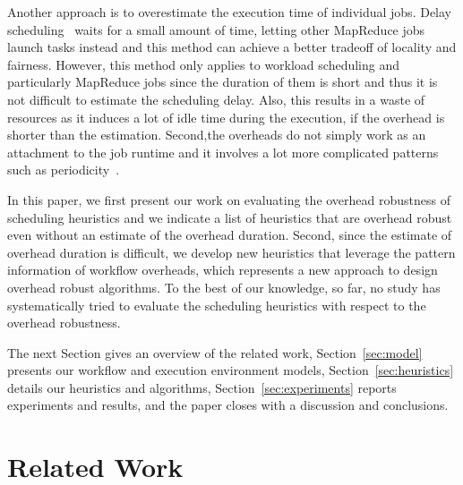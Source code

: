 \documentclass[final]{IEEEtran}
\begin{document}
Another approach is to overestimate the execution time of individual jobs. Delay scheduling~\cite{Zaharia10} waits for a small amount of time, letting other MapReduce jobs launch tasks instead and this method can achieve a better tradeoff of locality and fairness. However, this method only applies to workload scheduling and particularly MapReduce jobs since the duration of them is short and thus it is not difficult to estimate the scheduling delay. Also, this results in a waste of resources as it induces a lot of idle time during the execution, if the overhead is shorter than the estimation. Second,the overheads do not simply work as an attachment to the job runtime and it involves a lot more complicated patterns such as periodicity~\cite{Chen}. 

In this paper, we first present our work on evaluating the overhead robustness of scheduling heuristics and we indicate a list of heuristics that are overhead robust even without an estimate of the overhead duration. Second, since the estimate of overhead duration is difficult, we develop new heuristics that leverage the pattern information of workflow overheads, which represents a new approach to design overhead robust algorithms. To the best of our knowledge, so far, no study has systematically tried to evaluate the scheduling heuristics with respect to the overhead robustness.  

The next Section gives an overview of the related work, Section~\ref{sec:model} presents our workflow and execution environment models, Section~\ref{sec:heuristics} details our heuristics and algorithms, Section~\ref{sec:experiments} reports experiments and results, and the paper closes with a discussion and conclusions.



\section{Related Work}
\end{document}
